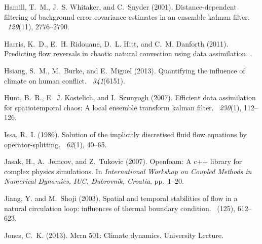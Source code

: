 \documentclass[12pt]{report}
\begin{document}
\begin{thebibliography}{}
Hamill, T.~M., J.~S. Whitaker, and C.~Snyder (2001).
\newblock Distance-dependent filtering of background error covariance estimates
  in an ensemble kalman filter.
~{\em 129\/}(11), 2776--2790.

Harris, K.~D., E.~H. Ridouane, D.~L. Hitt, and C.~M. Danforth (2011).
\newblock Predicting flow reversals in chaotic natural convection using data
  assimilation.
.

Hsiang, S.~M., M.~Burke, and E.~Miguel (2013).
\newblock Quantifying the influence of climate on human conflict.
~{\em 341\/}(6151).

Hunt, B.~R., E.~J. Kostelich, and I.~Szunyogh (2007).
\newblock Efficient data assimilation for spatiotemporal chaos: A local
  ensemble transform kalman filter.
~{\em 230\/}(1), 112--126.

Issa, R.~I. (1986).
\newblock Solution of the implicitly discretised fluid flow equations by
  operator-splitting.
~{\em 62\/}(1), 40--65.

Jasak, H., A.~Jemcov, and Z.~Tukovic (2007).
\newblock Openfoam: A c++ library for complex physics simulations.
\newblock In {\em International Workshop on Coupled Methods in Numerical
  Dynamics, IUC, Dubrovnik, Croatia}, pp.\  1--20.

Jiang, Y. and M.~Shoji (2003).
\newblock Spatial and temporal stabilities of flow in a natural circulation
  loop: influences of thermal boundary condition.
~(125), 612--623.

Jones, C.~K. (2013).
\newblock Mcrn 501: Climate dynamics.
\newblock University Lecture.


\end{thebibliography}
\end{document}

